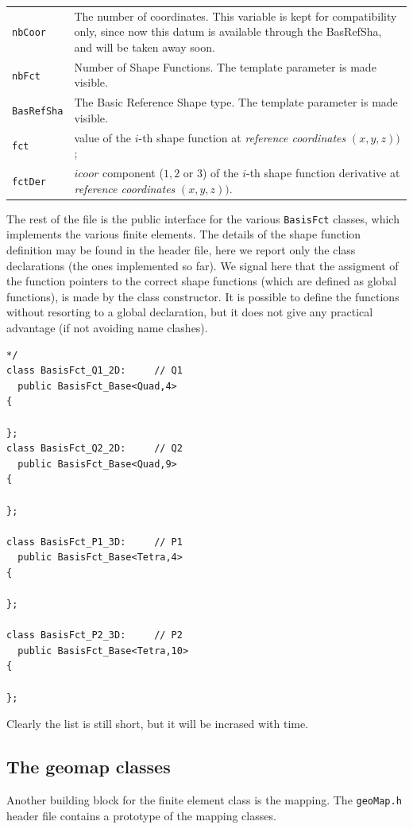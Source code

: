 \begin{tabularx}{\textwidth}{lX}
\hline
\texttt{nbCoor}& The number of coordinates. This variable is kept for
compatibility only, since now this datum is available through
the BasRefSha, and will be taken away soon.\\
\texttt{nbFct} & Number of Shape Functions. The template parameter
is made visible.\\
\texttt{BasRefSha} & The  Basic Reference Shape type. The template parameter
is made visible.\\
\texttt{fct} & value of the $i$-th shape function at \emph{reference coordinates} $(x,y,z))$;\\
\texttt{fctDer} & $icoor$ component ($1,2$ or $3$)
of the $i$-th shape function derivative at \emph{reference coordinates} $(x,y,z))$. \\
\hline
\end{tabularx}
The rest of the file is the public interface for the various
\texttt{BasisFct} classes, which implements the various 
finite elements. The details of the shape function definition may be found
in the header file, here we report only the class declarations (the ones
implemented so far). We signal here that the assigment of the
function pointers to the correct shape functions (which are defined as global
functions), is made by the class constructor. It is possible to define the functions
without resorting to a global declaration, but it does not give any practical advantage
(if not avoiding name clashes).

\begin{verbatim}
*/
class BasisFct_Q1_2D:     // Q1
  public BasisFct_Base<Quad,4>
{

};
class BasisFct_Q2_2D:     // Q2
  public BasisFct_Base<Quad,9>
{

};

class BasisFct_P1_3D:     // P1
  public BasisFct_Base<Tetra,4>
{

};

class BasisFct_P2_3D:     // P2
  public BasisFct_Base<Tetra,10>
{

};
\end{verbatim}
Clearly the list is still short, but it will be incrased with time.
\subsection{The geomap classes}
Another building block for the finite element class is the mapping.
The \texttt{geoMap.h} header file contains a prototype of the mapping
classes. 

